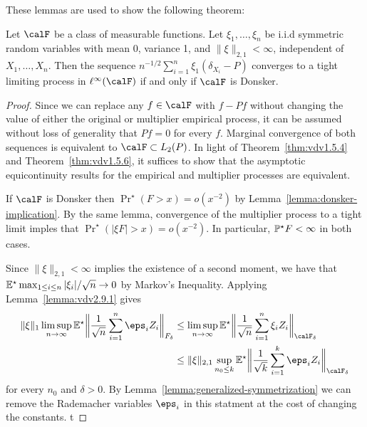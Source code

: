 These lemmas are used to show the following theorem: 
\begin{theorem}
	\label{thm:vdv2.9.2}
	Let \(\calF\) be a class of measurable functions. Let \(\xi_1,\dots,\xi_n\) be i.i.d symmetric random variables with mean 0, variance 1, and \(\|\xi\|_{2,1} < \infty\), independent of \(X_1,\dots,X_n\). Then the sequence \(n^{-1/2}\sum_{i=1}^n \xi_1(\delta_{X_i}-P)\) converges to a tight limiting process in \(\ell^\infty(\calF)\) if and only if \(\calF\) is Donsker.
\end{theorem}
\begin{proof}
	Since we can replace any \(f\in\calF\) with \(f-Pf\) without changing the value of either the original or multiplier empirical process, it can be assumed without loss of generality that \(Pf=0\) for every \(f\). Marginal convergence of both sequences is equivalent to \(\calF\subset L_2(P)\). In light of Theorem~\ref{thm:vdv1.5.4} and Theorem~\ref{thm:vdv1.5.6}, it suffices to show that the asymptotic equicontinuity results for the empirical and multiplier processes are equivalent.

	If \(\calF\) is Donsker then \(\Pr^\star\left(F>x\right)=o(x^{-2})\) by Lemma~\ref{lemma:donsker-implication}. By the same lemma, convergence of the multiplier process to a tight limit imples that \(\Pr^\star\left(|\xi F|>x\right)=o(x^{-2})\). In particular, \(\P^\star F <\infty\) in both cases. 

	Since \(\|\xi\|_{2,1}<\infty\) implies the existence of a second moment, we have that \(\E^\star\max_{1\leq i\leq n}|\xi_i|/\sqrt{n}\to 0\) by Markov's Inequality. Applying Lemma~\ref{lemma:vdv2.9.1} gives
	\begin{align*}
	   \|\xi\|_1\limsup_{n\to\infty}\E^\star\bigg\|\frac{1}{\sqrt{n}}\sum_{i=1}^n \eps_iZ_i\bigg\|_{F_\delta} 	
	   &\leq \limsup_{n\to\infty}\E^\star\bigg\|\frac{1}{\sqrt{n}}\sum_{i=1}^n \xi_iZ_i\bigg\|_{\calF_\delta} \\
	   &\leq \|\xi\|_{2,1}\sup_{n_0\leq k}\E^\star\bigg\|\frac{1}{\sqrt{k}}\sum_{i=1}^k\eps_iZ_i\bigg\|_{\calF_\delta}
	\end{align*}
	for every \(n_0\) and \(\delta > 0\). By Lemma~\ref{lemma:generalized-symmetrization} we can remove the Rademacher variables \(\eps_i\) in this statment at the cost of changing the constants.
	t
\end{proof}


